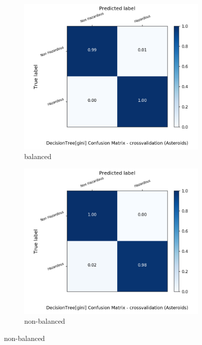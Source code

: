 \begin{figure}[H]
	\centering
	\begin{subfigure}{.5\textwidth}
		\centering
		\includegraphics[width=1.1\textwidth]{Plots/asteroids/asteroids_DecisionTree_gini_balance_True_crossvalidation.png}
		\caption{balanced}
	\end{subfigure}%
	\begin{subfigure}{.5\textwidth}
		\centering
		\includegraphics[width=1.1\textwidth]{Plots/asteroids/asteroids_DecisionTree_gini_balance_False_crossvalidation.png}
		\caption{non-balanced}
	\end{subfigure}
\end{figure}
